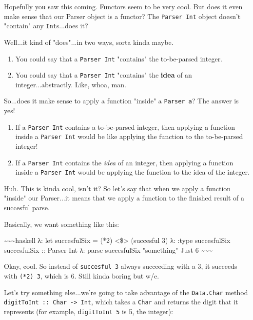 \documentclass[]{article}
\begin{document}
Hopefully you saw this coming. Functors seem to be very cool. But does it even
make sense that our Parser object is a functor? The \texttt{Parser\ Int} object
doesn't "contain" any \texttt{Int}s...does it?

Well...it kind of "does"...in two ways, sorta kinda maybe.

\begin{enumerate}
\tightlist
\item
  You could say that a \texttt{Parser\ Int} "contains" the to-be-parsed integer.
\item
  You could say that a \texttt{Parser\ Int} "contains" the \textbf{idea} of an
  integer...abstractly. Like, whoa, man.
\end{enumerate}

So...does it make sense to apply a function "inside" a \texttt{Parser\ a}? The
answer is yes!

\begin{enumerate}
\tightlist
\item
  If a \texttt{Parser\ Int} contains a to-be-parsed integer, then applying a
  function inside a \texttt{Parser\ Int} would be like applying the function to
  the to-be-parsed integer!
\item
  If a \texttt{Parser\ Int} contains the \emph{idea} of an integer, then
  applying a function inside a \texttt{Parser\ Int} would be applying the
  function to the idea of the integer.
\end{enumerate}

Huh. This is kinda cool, isn't it? So let's say that when we apply a function
"inside" our Parser...it means that we apply a function to the finished result
of a succesful parse.

Basically, we want something like this:

\textasciitilde{}\textasciitilde{}\textasciitilde{}haskell λ: let succesfulSix =
(*2) \textless{}\$\textgreater{} (succesful 3) λ: :type succesfulSix
succesfulSix :: Parser Int λ: parse succesfulSix "something" Just 6
\textasciitilde{}\textasciitilde{}\textasciitilde{}

Okay, cool. So instead of \texttt{succesful\ 3} always succeeding with a 3, it
succeeds with \texttt{(*2)\ 3}, which is 6. Still kinda boring but w/e.

Let's try something else...we're going to take advantage of the
\texttt{Data.Char} method \texttt{digitToInt\ ::\ Char\ -\textgreater{}\ Int},
which takes a \texttt{Char} and returns the digit that it represents (for
example, \texttt{digitToInt\ \textquotesingle{}5\textquotesingle{}} is 5, the
integer):
\end{document}
